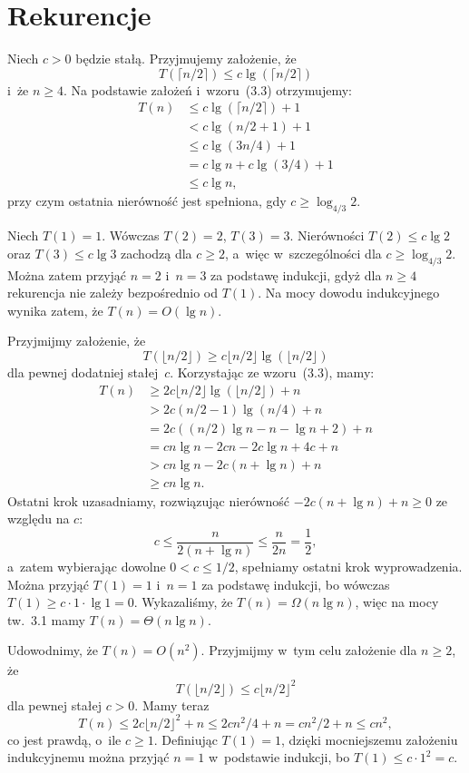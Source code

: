 \chapter{Rekurencje}


\exercise %
Niech $c>0$ będzie stałą. Przyjmujemy założenie, że
\[
    T(\lceil n/2\rceil)\le c\lg(\lceil n/2\rceil)
\]
i~że $n\ge4$. Na podstawie założeń i~wzoru~(3.3) otrzymujemy:
\begin{align*}
	T(n) &\le c\lg(\lceil n/2\rceil)+1 \\
	&< c\lg(n/2+1)+1 \\
	&\le c\lg(3n/4)+1 \\
	&= c\lg n+c\lg(3/4)+1 \\
	&\le c\lg n,
\end{align*}
przy czym ostatnia nierówność jest spełniona, gdy $c\ge\log_{4/3}2$.

Niech $T(1)=1$. Wówczas $T(2)=2$, $T(3)=3$. Nierówności $T(2)\le c\lg2$ oraz $T(3)\le c\lg3$ zachodzą dla $c\ge2$, a~więc w~szczególności dla $c\ge\log_{4/3}2$. Można zatem przyjąć $n=2$ i~$n=3$ za podstawę indukcji, gdyż dla $n\ge4$ rekurencja nie zależy bezpośrednio od $T(1)$. Na mocy dowodu indukcyjnego wynika zatem, że $T(n)=O(\lg n)$.

\exercise %
Przyjmijmy założenie, że
\[
	T(\lfloor n/2\rfloor) \ge c\lfloor n/2\rfloor\lg(\lfloor n/2\rfloor)
\]
dla pewnej dodatniej stałej~$c$. Korzystając ze wzoru~(3.3), mamy:
\begin{align*}
	T(n) &\ge 2c\lfloor n/2\rfloor\lg(\lfloor n/2\rfloor)+n \\
	&> 2c(n/2-1)\lg(n/4)+n \\
	&= 2c((n/2)\lg n-n-\lg n+2)+n \\
	&= cn\lg n-2cn-2c\lg n+4c+n \\
	&> cn\lg n-2c(n+\lg n)+n \\
	&\ge cn\lg n.
\end{align*}
Ostatni krok uzasadniamy, rozwiązując nierówność $-2c(n+\lg n)+n\ge0$ ze względu na $c$:
\[
	c \le \frac{n}{2(n+\lg n)} \le \frac{n}{2n} = \frac{1}{2},
\]
a~zatem wybierając dowolne $0<c\le1/2$, spełniamy ostatni krok wyprowadzenia. Można przyjąć $T(1)=1$ i~$n=1$ za podstawę indukcji, bo wówczas $T(1)\ge c\cdot1\cdot\lg1=0$. Wykazaliśmy, że $T(n)=\Omega(n\lg n)$, więc na mocy tw.~3.1 mamy $T(n)=\Theta(n\lg n)$.

\exercise %
Udowodnimy, że $T(n)=O(n^2)$. Przyjmijmy w~tym celu założenie dla $n\ge2$, że
\[
    T(\lfloor n/2\rfloor) \le c\lfloor n/2\rfloor^2
\]
dla pewnej stałej $c>0$. Mamy teraz
\[
	T(n) \le 2c\lfloor n/2\rfloor^2+n \le 2cn^2\!/4 + n = cn^2\!/2+n \le cn^2,
\]
co jest prawdą, o~ile $c\ge1$. Definiując $T(1)=1$, dzięki mocniejszemu założeniu indukcyjnemu można przyjąć $n=1$ w~podstawie indukcji, bo $T(1)\le c\cdot1^2=c$.

